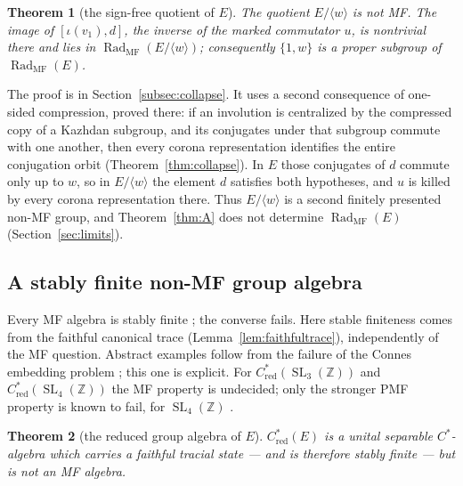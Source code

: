\documentclass[11pt]{amsart}
\newcommand{\leanverified}[2]{\ignorespaces}
\theoremstyle{definition}
\theoremstyle{remark}
\theoremstyle{plain}
\newtheorem{mainthm}{Theorem}
\newcommand{\SL}{\operatorname{SL}}
\newcommand{\Cred}{C^*_{\mathrm{red}}}
\begin{document}
\begin{mainthm}[the sign-free quotient of $E$]\label{thm:signfree}
The quotient $E/\langle w\rangle$ is not MF\@.  The image of
$[\iota(v_1),d]$, the inverse of the marked commutator $u$, is
nontrivial there and lies in
$\operatorname{Rad}_{\mathrm{MF}}(E/\langle w\rangle)$; consequently
$\{1,w\}$ is a proper subgroup of
$\operatorname{Rad}_{\mathrm{MF}}(E)$.
\leanverified{Sofic/LiteralSignFreeQuotient}{GroupApproximation.LiteralSignFreeQuotient.signFree_collapse}
\leanverified{Sofic/LiteralSignFreeQuotient}{GroupApproximation.LiteralSignFreeQuotient.signFreeQuotient_not_isCDEOperatorMF}
\leanverified{Sofic/LiteralSignFreeQuotient}{GroupApproximation.LiteralSignFreeQuotient.commutator_not_zpow_mark}
\end{mainthm}

The proof is in Section~\ref{subsec:collapse}.  It uses a second
consequence of one-sided compression, proved there: if an involution
is centralized by the compressed copy of a Kazhdan subgroup, and its
conjugates under that subgroup commute with one another, then every
corona representation identifies the entire conjugation orbit
(Theorem~\ref{thm:collapse}).  In $E$ those conjugates of $d$ commute
only up to $w$, so in $E/\langle w\rangle$ the element $d$ satisfies
both hypotheses, and $u$ is killed by every corona representation
there.  Thus $E/\langle w\rangle$ is a second finitely presented
non-MF group, and Theorem~\ref{thm:A} does not determine
$\operatorname{Rad}_{\mathrm{MF}}(E)$ (Section~\ref{sec:limits}).

\subsection*{A stably finite non-MF group algebra}
Every MF algebra is stably finite \cite{BK}; the converse fails.  Here
stable finiteness comes from the faithful canonical trace
(Lemma~\ref{lem:faithfultrace}), independently of the MF question.
Abstract examples follow from the failure of the Connes embedding
problem \cite{FGH}; this one is explicit.  For
$\Cred(\SL_3(\mathbb Z))$ and $\Cred(\SL_4(\mathbb Z))$ the MF
property is undecided; only the stronger PMF property is known to
fail, for $\SL_4(\mathbb Z)$ \cite{MdlS}.

\begin{mainthm}[the reduced group algebra of $E$]\label{thm:D}
$\Cred(E)$ is a unital separable $C^*$-algebra which carries a
faithful tracial state --- and is therefore stably finite --- but is
not an MF algebra.
\leanverified{Sofic/LiteralNonMFEndpoint}{GroupApproximation.LiteralNonMFEndpoint.manuscriptTheoremD}
\end{mainthm}
\end{document}

